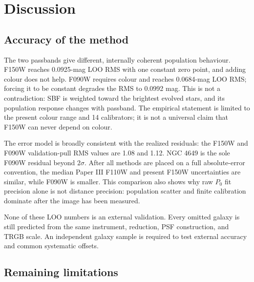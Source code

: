 \documentclass[nodoi,nocopyright]{pas}
\begin{document}
\FloatBarrier
\section{Discussion}

\subsection{Accuracy of the method}

The two passbands give different, internally coherent population behaviour.
F150W reaches 0.0925-mag LOO RMS with one constant
zero point, and adding colour does not help. F090W requires colour and reaches
0.0684-mag LOO RMS; forcing it to be constant degrades the RMS
to 0.0992 mag. This is not a contradiction: SBF is weighted toward the
brightest evolved stars, and its population response changes with passband.
The empirical statement is limited to the present colour range and 14
calibrators; it is not a universal claim that F150W can never depend on colour.

The error model is broadly consistent with the realized residuals: the F150W
and F090W validation-pull RMS values are 1.08 and 1.12. NGC 4649 is the sole
F090W residual beyond $2\sigma$. After all methods are placed on a full
absolute-error convention, the median Paper III F110W and present F150W
uncertainties are similar, while F090W is smaller. This comparison also shows
why raw $P_0$ fit precision alone is not distance precision: population
scatter and finite calibration dominate after the image has been measured.

None of these LOO numbers is an external validation. Every omitted galaxy is
still predicted from the same instrument, reduction, PSF construction, and
TRGB scale. An independent galaxy sample is required to test external
accuracy and common systematic offsets.

\subsection{Remaining limitations}
\end{document}
